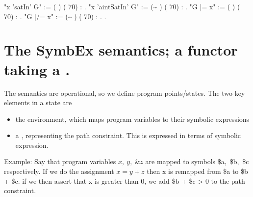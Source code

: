 \documentclass[12pt]{report}
\begin{document}
  
\begin{coqdoccode}
\coqdocindent{1.00em}
 "x     'satIn' G" := (    ) (  70) : .\coqdoceol
\coqdocindent{1.00em}
 "x 'aintSatIn' G" := (\~{}   ) (  70) : .\coqdoceol
\coqdocemptyline
\coqdocindent{1.00em}
 "G |=  x" := (    ) (  70) : .\coqdoceol
\coqdocindent{1.00em}
 "G |/= x" := (\~{}   ) (  70) : .\coqdoceol
\coqdocemptyline
\coqdocnoindent
{}         .\coqdoceol
\coqdocemptyline
\end{coqdoccode}
\section{The SymbEx semantics; a functor taking a \texorpdfstring{\protect}{Solver}.}




      The semantics are operational, so we define program points/states.
      The two key elements in a state are

\begin{itemize}
\item  the environment, which maps program variables to their symbolic
        expressions

\item  a  , representing the path constraint. This is expressed
        in terms of symbolic expression.

\end{itemize}


      Example: Say that program variables $x,\ y,\ \& z$ are mapped to symbols
      \$a,\ \$b,\ \$c respectively. If we do the assignment $x = y+z$
      then x is remapped from \$a to \$b + \$c. if we then assert
      that x is greater than 0, we add \$b + \$c > 0 to the path
      constraint.
\end{document}
